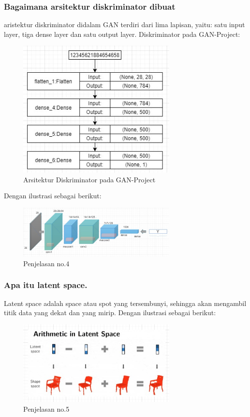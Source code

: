 \subsubsection{Bagaimana arsitektur diskriminator dibuat}
\hfill\break
aristektur diskriminator didalam GAN terdiri dari lima lapisan, yaitu: satu input layer, tiga dense layer dan satu output layer. Diskriminator pada GAN-Project:
\begin{figure}[H]
	\centering
	\includegraphics[width=8cm]{figures/1174067/8/4a.jpg}
	\caption{Arsitektur Diskriminator pada GAN-Project}
\end{figure}
Dengan ilustrasi sebagai berikut:
\begin{figure}[H]
	\centering
	\includegraphics[width=8cm]{figures/1174067/8/4.jpg}
	\caption{Penjelasan no.4}
\end{figure}

\subsubsection{Apa itu latent space.}
\hfill\break
Latent space adalah space atau spot yang tersembunyi, sehingga akan mengambil titik data yang dekat dan yang mirip.
Dengan ilustrasi sebagai berikut:
\begin{figure}[H]
	\centering
	\includegraphics[width=8cm]{figures/1174067/8/5.jpg}
	\caption{Penjelasan no.5}
\end{figure}

